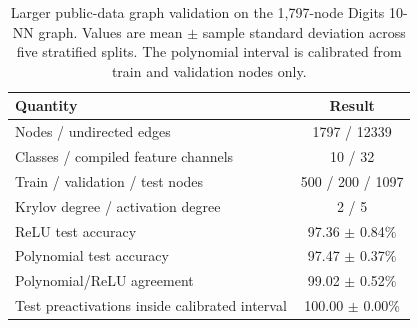 \begin{table}[t]
\centering
\caption{Larger public-data graph validation on the 1,797-node Digits 10-NN graph. Values are mean $\pm$ sample standard deviation across five stratified splits. The polynomial interval is calibrated from train and validation nodes only.}
\label{tab:digits-knn}
\begin{tabular}{lc}
\toprule
Quantity & Result \\
\midrule
Nodes / undirected edges & 1797 / 12339 \\
Classes / compiled feature channels & 10 / 32 \\
Train / validation / test nodes & 500 / 200 / 1097 \\
Krylov degree / activation degree & 2 / 5 \\
ReLU test accuracy & 97.36 $\pm$ 0.84\% \\
Polynomial test accuracy & 97.47 $\pm$ 0.37\% \\
Polynomial/ReLU agreement & 99.02 $\pm$ 0.52\% \\
Test preactivations inside calibrated interval & 100.00 $\pm$ 0.00\% \\
\bottomrule
\end{tabular}
\end{table}
